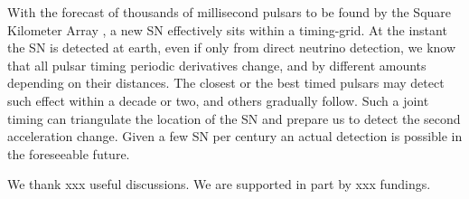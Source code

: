 \documentclass[aps,showpacs,twocolumn,floats,prd,superscriptaddress,nofootinbib]{revtex4-1}
\begin{document}
With the forecast of thousands of millisecond pulsars to be found by the Square Kilometer Array \cite{SKA}, a new SN effectively sits within a timing-grid. At the instant the SN is detected at earth, even if only from direct neutrino detection, we know that all pulsar timing periodic derivatives change, and by different amounts depending on their distances. The closest or the best timed pulsars may detect such effect within a decade or two, and others gradually follow. Such a joint timing can triangulate the location of the SN and prepare us to detect the second acceleration change. Given a few SN per century\cite{SNrate06} an actual detection is possible in the foreseeable future.


\acknowledgments

We thank xxx useful discussions. We are supported in part by xxx fundings.

\appendix

%

\end{document}
